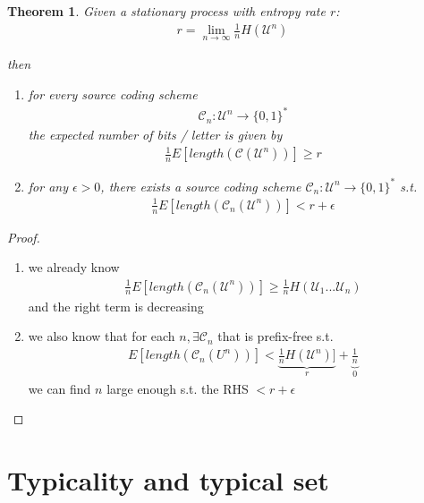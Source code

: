 \documentclass{article}
\newtheorem{theorem}{Theorem}[section]
\def\U{\mathcal{U}}
\def\C{\mathcal{C}}
\begin{document}

\begin{theorem}
  Given a stationary process with entropy rate $r$:
  \begin{align*}
    r = \lim_{n \rightarrow \infty} \frac{1}{n} H(\U^n)
  \end{align*}

  then 
  \begin{enumerate}
    \item for every source coding scheme
    \begin{align*}
      \C_n: \U^n \rightarrow \{0, 1\}^*
    \end{align*}
    the expected number of bits / letter is given by
    \begin{align*}
      \frac{1}{n} E[length(\C(\U^n))] \geq r
    \end{align*}
    \item for any $\epsilon > 0$, there exists a source coding scheme $\C_n: \U^n \rightarrow \{0, 1\}^*$ s.t.
    \begin{align*}
      \frac{1}{n} E[length(\C_n(\U^n))] < r + \epsilon
    \end{align*}
  \end{enumerate}
\end{theorem}

\begin{proof}  
  \begin{enumerate}
    \item we already know
    \begin{align*}
      \frac{1}{n} E[length(\C_n(\U^n))] \geq \frac{1}{n} H(\U_1 ... \U_n)
    \end{align*}
    and the right term is decreasing
    \item we also know that for each $n, \exists \C_n$ that is prefix-free s.t.
    \begin{align*}
      E[length(\C_n(U^n))] < \underbrace{\frac{1}{n} H(\U^n)]}_{r} + \underbrace{\frac{1}{n}}_{0}
    \end{align*}
    we can find $n$ large enough s.t. the RHS $< r + \epsilon$
  \end{enumerate}
\end{proof}

\section{Typicality and typical set}
\end{document}
